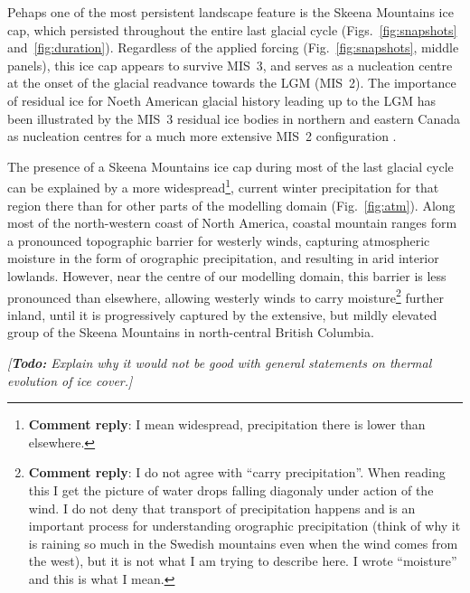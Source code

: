 \documentclass[tc, manuscript]{copernicus}
\newcommand{\renote}[1]{\footnote{\textbf{Comment reply}: #1}}
\newcommand{\todo}[1]{\emph{[\textbf{Todo:} #1]}}
\begin{document}
Pehaps one of the most persistent landscape feature is the Skeena Mountains ice
cap, which persisted throughout the entire last glacial cycle
(Figs.~\ref{fig:snapshots} and~\ref{fig:duration}). Regardless of the applied
forcing (Fig.~\ref{fig:snapshots}, middle panels), this ice cap appears to
survive MIS~3, and serves as a nucleation centre at the onset of the glacial
readvance towards the LGM (MIS~2). The importance of residual ice for Noeth
American glacial history leading up to the LGM has been illustrated by the
MIS~3 residual ice bodies in northern and eastern Canada as nucleation centres
for a much more extensive MIS~2 configuration \citep{Kleman.etal.2010}.

The presence of a Skeena Mountains ice cap during most of the last glacial
cycle can be explained by a more widespread\renote{
    I mean widespread, precipitation there is lower than elsewhere.},
current winter precipitation for that region there than for other parts of the
modelling domain (Fig.~\ref{fig:atm}). Along most of the north-western coast of
North America, coastal mountain ranges form a pronounced topographic barrier
for westerly winds, capturing atmospheric moisture in the form of orographic
precipitation, and resulting in arid interior lowlands. However, near the
centre of our modelling domain, this barrier is less pronounced than elsewhere,
allowing westerly winds to carry moisture\renote{
    I do not agree with ``carry precipitation''. When reading this I get the
    picture of water drops falling diagonaly under action of the wind. I do not
    deny that transport of precipitation happens and
    is an important process for understanding orographic
    precipitation (think of why it is raining so much in the Swedish mountains
    even when the wind comes from the west), but it is not what I am trying to
    describe here. I wrote ``moisture'' and this is what I mean.}
further inland, until it is progressively captured by the extensive, but mildly
elevated group of the Skeena Mountains in north-central British Columbia.

\todo{Explain why it would not be good with general statements on thermal
      evolution of ice cover.}
\end{document}
